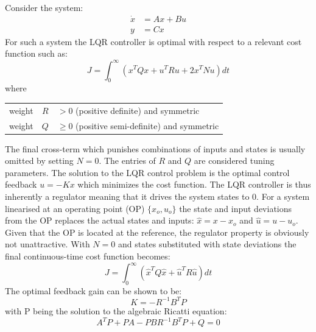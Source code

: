 \smallskip
\noindent Consider the system:
\begin{equation}\label{eq:ctrl_sys}
	\begin{split}
		\dot x &= A x + B u \\
		y &= Cx
	\end{split}
\end{equation}
For such a system the LQR controller is optimal with respect to a relevant cost function such as:
\begin{equation}\label{eq:lqr_cost}
	J = \int_{0}^{\infty} \left(x^T Q x + u^T R u + 2x^T N u\right) dt
\end{equation}
where
\begin{center}
	\begin{tabular}{l r l }
		weight & $R$         & $ > 0$\hspace{1mm} (positive definite) and symmetric       \\
		weight & $Q$		 & $\ge 0$\hspace{1mm} (positive semi-definite) and symmetric
	\end{tabular}
\end{center}
\smallskip
The final cross-term which punishes combinations of inputs and states is usually omitted by setting $ N = 0 $. The entries of $ R $ and $ Q $ are considered tuning parameters. The solution to the LQR control problem is the optimal control feedback $ u = -Kx $ which minimizes the cost function. The LQR controller is thus inherently a regulator meaning that it drives the system states to 0. For a system linearised at an operating point (OP) $ \{x_o, u_o\} $ the state and input deviations from the OP replaces the actual states and inputs: $ \hat x = x-x_o $ and $ \hat u = u-u_o $. Given that the OP is located at the reference, the regulator property is obviously not unattractive. With $ N = 0 $ and states substituted with state deviations the final continuous-time cost function becomes:
\begin{equation}\label{eq:lqr_cost_final}
	J = \int_{0}^{\infty} \left(\hat x^T Q \hat x + \hat u^T R \hat u\right) dt
\end{equation}
The optimal feedback gain can be shown to be: 
\begin{equation}\label{eq:lqr_K}
	K = -R^{-1} B^T P
\end{equation}
with P being the solution to the algebraic Ricatti equation:
\begin{equation}\label{lqr:ricatti}
	A^T P + P A - P B R^{-1} B^T P + Q = 0
\end{equation}

